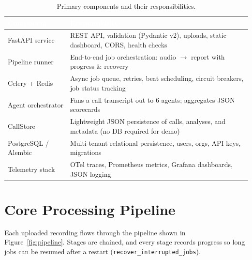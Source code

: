 \documentclass[11pt,a4paper]{article}
\begin{document}
\begin{table}[htbp]
  \centering
  \small
  \begin{tabular}{@{}p{38mm}p{105mm}@{}}
    \toprule
    \rowcolor{tablehead}
    \textcolor{white}{\textbf{Component}} & \textcolor{white}{\textbf{Responsibility}} \\
    \midrule
    FastAPI service & REST API, validation (Pydantic v2), uploads, static dashboard, CORS, health checks \\
    Pipeline runner & End-to-end job orchestration: audio $\rightarrow$ report with progress \& recovery \\
    Celery + Redis & Async job queue, retries, beat scheduling, circuit breakers, job status tracking \\
    Agent orchestrator & Fans a call transcript out to 6 agents; aggregates JSON scorecards \\
    CallStore & Lightweight JSON persistence of calls, analyses, and metadata (no DB required for demo) \\
    PostgreSQL / Alembic & Multi-tenant relational persistence, users, orgs, API keys, migrations \\
    Telemetry stack & OTel traces, Prometheus metrics, Grafana dashboards, JSON logging \\
    \bottomrule
  \end{tabular}
  \caption{Primary components and their responsibilities.}
\end{table}

\section{Core Processing Pipeline}

Each uploaded recording flows through the pipeline shown in Figure~\ref{fig:pipeline}.
Stages are chained, and every stage records progress so long jobs can be resumed after a
restart (\texttt{recover\_\allowbreak interrupted\_\allowbreak jobs}).
\end{document}
